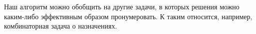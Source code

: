 Наш алгоритм можно обобщить на другие задачи, в которых решения можно каким-либо эффективным образом пронумеровать. К таким относится, например, комбинаторная задача о назначениях.








\sloppy
\showbib


 
